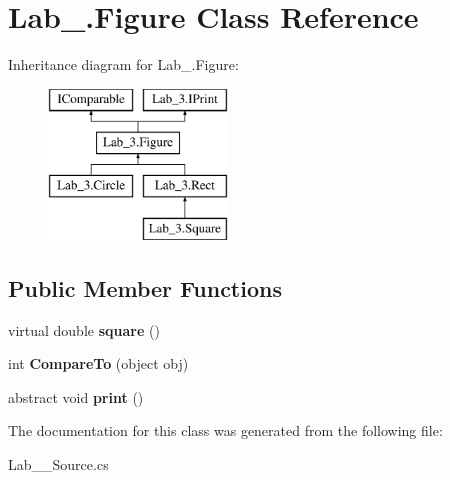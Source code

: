 \hypertarget{class_lab__3_1_1_figure}{}\section{Lab\+\_.\+Figure Class Reference}
\label{class_lab__3_1_1_figure}
Inheritance diagram for Lab\+\_.\+Figure\+:\begin{figure}[H]
\begin{center}
\leavevmode
\includegraphics[height=4.000000cm]{class_lab__3_1_1_figure}
\end{center}
\end{figure}
\subsection*{Public Member Functions}
\begin{DoxyCompactItemize}
\item 
\mbox{\label{class_lab__3_1_1_figure_a43f90db1a57fa8848845a5ec153568b8}} 
virtual double {\bfseries square} ()
\item 
\mbox{\label{class_lab__3_1_1_figure_a95235587aec0c4324f099727a76f3990}} 
int {\bfseries Compare\+To} (object obj)
\item 
\mbox{\label{class_lab__3_1_1_figure_a71d86f8405dea8375268373a75337779}} 
abstract void {\bfseries print} ()
\end{DoxyCompactItemize}


The documentation for this class was generated from the following file\+:\begin{DoxyCompactItemize}
\item 
Lab\+\_\+\_\+\+Source.\+cs\end{DoxyCompactItemize}
